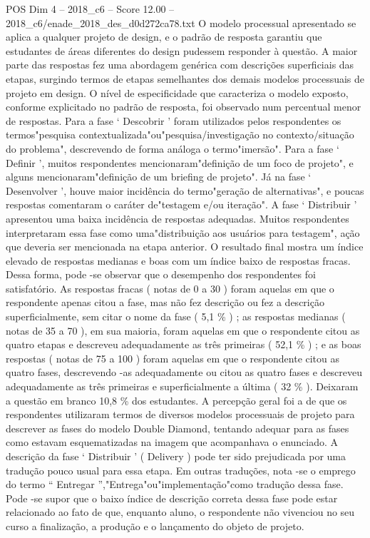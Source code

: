 \begin{textsample}{POS Dim 4 – 2018\_c6 – Score 12.00 – 2018\_c6/enade\_2018\_des\_d0d272ca78.txt}
O modelo processual apresentado se aplica a qualquer projeto de design, e o padrão de resposta garantiu que estudantes de áreas diferentes do design pudessem responder à questão.
A maior parte das respostas fez uma abordagem genérica com descrições superficiais das etapas, surgindo termos de etapas semelhantes dos demais modelos processuais de projeto em design.
O nível de especificidade que caracteriza o modelo exposto, conforme explicitado no padrão de resposta, foi observado num percentual menor de respostas.
Para a fase ‘ Descobrir ’ foram utilizados pelos respondentes os termos"pesquisa contextualizada"ou"pesquisa/investigação no contexto/situação do problema", descrevendo de forma análoga o termo"imersão".
Para a fase ‘ Definir ’, muitos respondentes mencionaram"definição de um foco de projeto", e alguns mencionaram"definição de um briefing de projeto".
Já na fase ‘ Desenvolver ’, houve maior incidência do termo"geração de alternativas", e poucas respostas comentaram o caráter de"testagem e/ou iteração".
A fase ‘ Distribuir ’ apresentou uma baixa incidência de respostas adequadas.
Muitos respondentes interpretaram essa fase como uma"distribuição aos usuários para testagem", ação que deveria ser mencionada na etapa anterior.
O resultado final mostra um índice elevado de respostas medianas e boas com um índice baixo de respostas fracas.
Dessa forma, pode -se observar que o desempenho dos respondentes foi satisfatório.
As respostas fracas ( notas de 0 a 30 ) foram aquelas em que o respondente apenas citou a fase, mas não fez descrição ou fez a descrição superficialmente, sem citar o nome da fase ( 5,1 \% ) ; as respostas medianas ( notas de 35 a 70 ), em sua maioria, foram aquelas em que o respondente citou as quatro etapas e descreveu adequadamente as três primeiras ( 52,1 \% ) ; e as boas respostas ( notas de 75 a 100 ) foram aquelas em que o respondente citou as quatro fases, descrevendo -as adequadamente ou citou as quatro fases e descreveu adequadamente as três primeiras e superficialmente a última ( 32 \% ).
Deixaram a questão em branco 10,8 \% dos estudantes.
A percepção geral foi a de que os respondentes utilizaram termos de diversos modelos processuais de projeto para descrever as fases do modelo Double Diamond, tentando adequar para as fases como estavam esquematizadas na imagem que acompanhava o enunciado.
A descrição da fase ‘ Distribuir ’ ( Delivery ) pode ter sido prejudicada por uma tradução pouco usual para essa etapa.
Em outras traduções, nota -se o emprego do termo “ Entregar ”,"Entrega"ou"implementação"como tradução dessa fase.
Pode -se supor que o baixo índice de descrição correta dessa fase pode estar relacionado ao fato de que, enquanto aluno, o respondente não vivenciou no seu curso a finalização, a produção e o lançamento do objeto de projeto.

\end{textsample}

